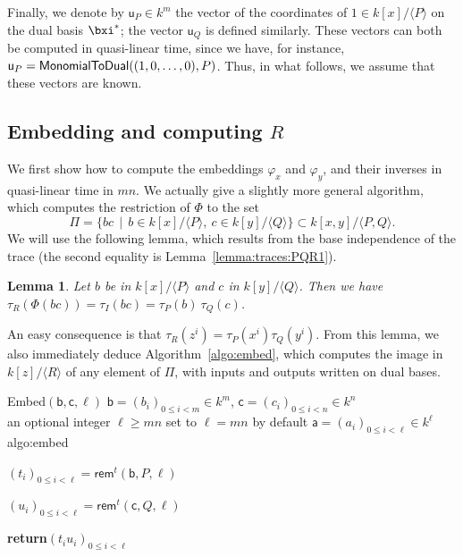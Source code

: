 \documentclass{sig-alternate}
\def\va {\ensuremath{\mathsf{a}}}
\def\vu {\ensuremath{\mathsf{u}}}
\def\vb {\ensuremath{\mathsf{b}}}
\def\vc {\ensuremath{\mathsf{c}}}
\def\rem {\ensuremath{\mathsf{rem}}}
\newcounter{algo}
\newenvironment{algorithm_endline}[4]{\small\begin{center}\begin{minipage}{0.48\textwidth}
      \refstepcounter{algo}
      \label{#4}
      \sf
      \rule{\textwidth}{0.2pt}\\
      \makebox[\textwidth][c]{Algorithm~\arabic{algo}:~\textbf{#1}}\\
      \rule[0.5\baselineskip]{\textwidth}{0.2pt}\\

      \vspace{-12pt}

      \parbox{\textwidth}{\textbf{Input} #2}
      \parbox{\textwidth}{\textbf{Output} #3}

\vspace{-7pt}

      \begin{enumerate*}}{\end{enumerate*}
      \vspace{-11pt}
      \rule{\textwidth}{0.2pt}
\end{minipage}\end{center}
}
\newcommand{\ang}[1]{\langle#1\rangle}
\newtheorem{Lemma}{Lemma}
\begin{document}
Finally, we denote by $\vu_P \in k^m$ the vector of the coordinates of
$1 \in k[x]/\ang{P}$ on the dual basis $\bxi^\ast$; the vector
$\vu_Q$ is defined similarly. These vectors can both be computed in
quasi-linear time, since we have, for instance, $\vu_P = {\sf
  MonomialToDual}((1,0,\dots,0), P)$. Thus, in what follows, we assume
that these vectors are known.


\subsection{Embedding and computing $R$} 

We first show how to compute the embeddings $\varphi_x$ and
$\varphi_y$, and their inverses in quasi-linear time in $mn$. We
actually give a slightly more general algorithm, which computes the
restriction of $\Phi$ to the set $$\Pi= \{bc \,\mid\, b\in
k[x]/\ang{P},\ c\in k[y]/\ang{Q}\} \subset k[x,y]/\ang{P,Q}.$$ We
will use the following lemma, which results from the base independence
of the trace (the second equality is Lemma~\ref{lemma:traces:PQR1}).
\begin{Lemma}
  \label{lemma:traces:PQR}
  Let $b$ be in $k[x]/\ang{P}$ and $c$ in $k[y]/\ang{Q}$. Then we have
  $\tau_R(\Phi(bc)) = \tau_I(bc) = \tau_P(b) \ \tau_Q(c)$.
\end{Lemma}
An easy consequence is that $\tau_R(z^i) =
\tau_P(x^i)\tau_Q(y^i)$. From this lemma, we also immediately deduce
Algorithm~\ref{algo:embed}, which computes the image in $k[z]/\ang{R}$
of any element of $\Pi$, with inputs and outputs written on dual
bases.

\vspace{-2ex}

\begin{algorithm_endline}
{Embed$(\vb,\vc,\ell)$}
{$\vb=(b_i)_{0 \le i < m} \in k^m$, $\vc=(c_i)_{0 \le i < n} \in k^n$\\
    an optional integer $\ell \ge mn$ set to $\ell=mn$ by default}
{$\va=(a_i)_{0 \le i < \ell} \in k^{\ell}$}
{algo:embed}
\item $(t_i)_{0\le i<\ell} = \rem^t(\vb,P,\ell)$
\item $(u_i)_{0\le i<\ell} = \rem^t(\vc,Q,\ell)$
\item {\bf return}$(t_i u_i)_{0 \le i <\ell}$
\end{algorithm_endline}
\end{document}
